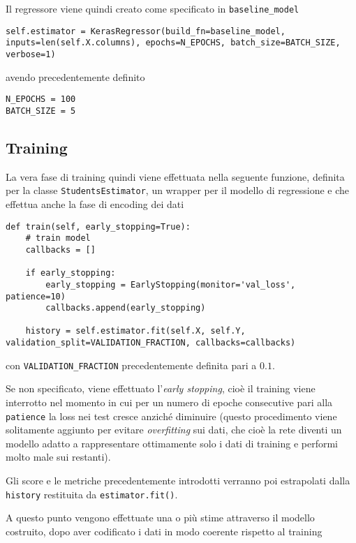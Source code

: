 Il regressore viene quindi creato come specificato in \lstinline{baseline_model}

\begin{verbatim}
self.estimator = KerasRegressor(build_fn=baseline_model, inputs=len(self.X.columns), epochs=N_EPOCHS, batch_size=BATCH_SIZE, verbose=1)
\end{verbatim}

avendo precedentemente definito

\begin{verbatim}
N_EPOCHS = 100
BATCH_SIZE = 5
\end{verbatim}

\subsection{Training} %
\label{sub:methods_ml_training}

La vera fase di training quindi viene effettuata nella seguente funzione, definita per la classe 
\lstinline{StudentsEstimator}, un wrapper per il modello di regressione e che effettua anche la fase
di encoding dei dati

\begin{verbatim}
def train(self, early_stopping=True):
    # train model
    callbacks = []

    if early_stopping:
        early_stopping = EarlyStopping(monitor='val_loss', patience=10)
        callbacks.append(early_stopping)

    history = self.estimator.fit(self.X, self.Y, validation_split=VALIDATION_FRACTION, callbacks=callbacks)
\end{verbatim} 
\noindent
con \lstinline{VALIDATION_FRACTION} precedentemente definita pari a $0.1$. 

Se non specificato, viene effettuato l'\textit{early stopping}, cioè il training viene interrotto 
nel momento in cui per un numero di epoche consecutive pari alla \lstinline{patience} la loss nei test 
cresce anziché diminuire (questo procedimento viene solitamente aggiunto per evitare \textit{overfitting} 
sui dati, che cioè la rete diventi un modello adatto a rappresentare ottimamente solo i dati di training
e performi molto male sui restanti). 

Gli score e le metriche precedentemente introdotti verranno poi estrapolati dalla \lstinline{history} 
restituita da \lstinline{estimator.fit()}.

A questo punto vengono effettuate una o più stime attraverso il modello costruito, dopo aver codificato i 
dati in modo coerente rispetto al training

